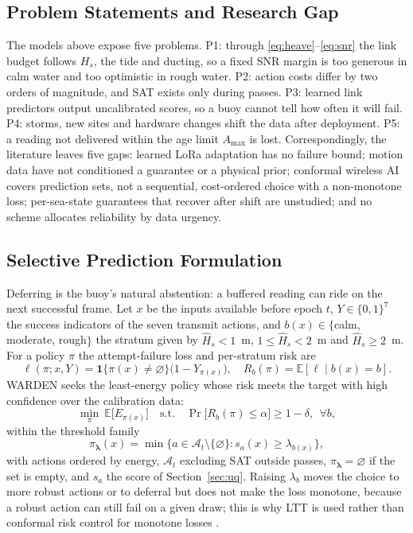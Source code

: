 \documentclass[journal]{IEEEtran}\def\WARDENieee{1}%
\newcommand{\Hs}{H_s}
\newcommand{\Hhat}{\hat H_s}
\newcommand{\defer}{\varnothing}
\begin{document}
\subsection{Problem Statements and Research Gap}
The models above expose five problems. P1: through \eqref{eq:heave}--\eqref{eq:snr} the link budget follows $\Hs$, the tide and ducting, so a fixed SNR margin is too generous in calm water and too optimistic in rough water. P2: action costs differ by two orders of magnitude, and SAT exists only during passes. P3: learned link predictors output uncalibrated scores, so a buoy cannot tell how often it will fail. P4: storms, new sites and hardware changes shift the data after deployment. P5: a reading not delivered within the age limit $A_{\max}$ is lost. Correspondingly, the literature leaves five gaps: learned LoRa adaptation \cite{b25,b26,b27} has no failure bound; motion data \cite{b28} have not conditioned a guarantee or a physical prior; conformal wireless AI \cite{b29,b31} covers prediction sets, not a sequential, cost-ordered choice with a non-monotone loss; per-sea-state guarantees that recover after shift are unstudied; and no scheme allocates reliability by data urgency.

\subsection{Selective Prediction Formulation}
Deferring is the buoy's natural abstention: a buffered reading can ride on the next successful frame. Let $x$ be the inputs available before epoch $t$, $Y\in\{0,1\}^7$ the success indicators of the seven transmit actions, and $b(x)\in\{$calm, moderate, rough$\}$ the stratum given by $\Hhat<1$~m, $1\le\Hhat<2$~m and $\Hhat\ge2$~m. For a policy $\pi$ the attempt-failure loss and per-stratum risk are
\begin{equation}
\ell(\pi;x,Y)=\mathbf{1}\{\pi(x)\neq\defer\}\big(1-Y_{\pi(x)}\big),\quad R_b(\pi)=\mathbb{E}[\ell\mid b(x)=b].\label{eq:loss}
\end{equation}
WARDEN seeks the least-energy policy whose risk meets the target with high confidence over the calibration data:
\begin{equation}
\min_\pi\ \mathbb{E}\big[E_{\pi(x)}\big]\quad\text{s.t.}\quad \Pr\big[R_b(\pi)\le\alpha\big]\ge1-\delta,\ \ \forall b ,\label{eq:problem}
\end{equation}
within the threshold family
\begin{equation}
\pi_{\boldsymbol\lambda}(x)=\min\{a\in\mathcal{A}_t\setminus\{\defer\}:s_a(x)\ge\lambda_{b(x)}\},\label{eq:policy}
\end{equation}
with actions ordered by energy, $\mathcal{A}_t$ excluding SAT outside passes, $\pi_{\boldsymbol\lambda}=\defer$ if the set is empty, and $s_a$ the score of Section~\ref{sec:uq}. Raising $\lambda_b$ moves the choice to more robust actions or to deferral but does not make the loss monotone, because a robust action can still fail on a given draw; this is why LTT \cite{b34} is used rather than conformal risk control for monotone losses \cite{b33}.
\end{document}
